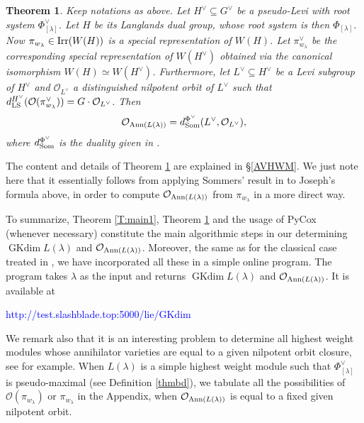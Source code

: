 \documentclass[reqno,12pt]{amsart}
\numberwithin{equation}{section}
\theoremstyle{plain}
\newtheorem{Thm}{Theorem}[section]
\theoremstyle{definition}
\newcommand{\lam}{\lambda}
\renewcommand{\subset}{\subseteq}
\newcommand{\gkd}{\operatorname{GKdim}}
\begin{document}
\begin{Thm}\label{T:main2}
Keep notations as above.
Let $H^\vee \subseteq G^\vee$ be a pseudo-Levi with root system $\Phi_{[\lambda]}^\vee$. Let $H$ be its Langlands dual group, whose root system is then $\Phi_{[\lambda]}$.
Now $\pi_{w_\lambda} \in {\rm Irr}(W(H))$ is a special representation of $W(H)$. Let $\pi^{\vee}_{w_\lambda}$ be the corresponding special representation of $W(H^{\vee})$ obtained via the canonical isomorphism $W(H) \simeq W(H^\vee)$. Furthermore, let $L^\vee\subset H^\vee$ be a Levi subgroup of $H^\vee$ and $\mathcal{O}_{L^\vee}$ a distinguished nilpotent orbit of $L^\vee$ such that $d_{\rm LS}^{H^\vee}(\mathcal{O}(\pi^{\vee}_{w_\lambda})) = G\cdot \mathcal{O}_{L^\vee}$.
Then 
$$\mathcal{O}_{{\rm Ann}(L(\lambda))} = d_{\rm Som}^{\Phi^\vee}(L^{\vee}, \mathcal{O}_{L^\vee}),$$
where $d_{\rm Som}^{\Phi^\vee}$ is the duality given in \cite{Sommers}.
\end{Thm}

The content and details of Theorem \ref{T:main2} are explained in \S \ref{AVHWM}. We just note here that it essentially follows from applying Sommers' result in \cite{som-98, Sommers} to Joseph's formula above, in order to compute $\mathcal{O}_{{\rm Ann}(L(\lambda))}$ from $\pi_{w_\lambda}$ in a more direct way.

To summarize, Theorem \ref{T:main1}, Theorem \ref{T:main2} and the usage of PyCox (whenever necessary) constitute the main algorithmic steps in our determining $\gkd L(\lambda)$ and $\mathcal{O}_{{\rm Ann}(L(\lambda))}$. Moreover, the same as for the classical case treated in \cite{BMW}, we have incorporated all these in a simple online program. The program takes $\lambda$ as the input and returns $\gkd L(\lambda)$ and $\mathcal{O}_{{\rm Ann}(L(\lambda))}$. It is available at
    \begin{center}
\textcolor{blue}{http://test.slashblade.top:5000/lie/GKdim}
    \end{center}



We remark also that it is an interesting problem to determine all highest weight modules whose annihilator varieties are  equal to a given nilpotent orbit closure, see \cite{Ir85,Jo98,Tamori,BMXX,BMW,BZhang} for example. When $L(\lam)$ is a simple  highest weight module such that $\Phi_{[\lambda]}^\vee$ is pseudo-maximal (see Definition \ref{thmbd}), we tabulate all the possibilities of $\mathcal{O}(\pi_{w_{\lam}})$ or $\pi_{w_{\lam}}$ in the Appendix, when $\mathcal{O}_{{\rm Ann}(L(\lambda))}$ is equal to a fixed given nilpotent orbit.
\end{document}
